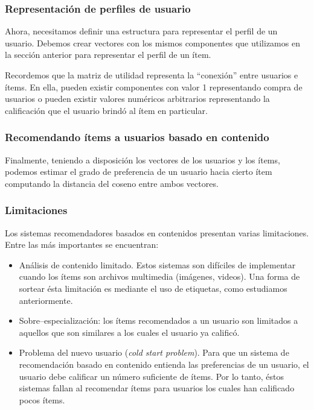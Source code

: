 			\subsubsection{Representación de perfiles de usuario}
				Ahora, necesitamos definir una estructura para representar el perfil de un usuario. Debemos crear vectores con los mismos componentes que utilizamos en la sección anterior para representar el perfil de un ítem. \par
				
				Recordemos que la matriz de utilidad representa la \enquote{conexión} entre usuarios e ítems. En ella, pueden existir componentes con valor 1 representando compra de usuarios o pueden existir valores numéricos arbitrarios representando la calificación que el usuario brindó al ítem en particular. \par
				
			\subsubsection{Recomendando ítems a usuarios basado en contenido}	
				Finalmente, teniendo a disposición los vectores de los usuarios y los ítems, podemos estimar el grado de preferencia de un usuario hacia cierto ítem computando la distancia del coseno entre ambos vectores.
				
			\subsubsection{Limitaciones}
				Los sistemas recomendadores basados en contenidos presentan varias limitaciones. Entre las más importantes se encuentran:
				\begin{itemize}
					\item Análisis de contenido limitado. Estos sistemas son difíciles de implementar cuando los ítems son archivos multimedia (imágenes, videos). Una forma de sortear ésta limitación es mediante el uso de etiquetas, como estudiamos anteriormente.
					\item Sobre--especialización: los ítems recomendados a un usuario son limitados a aquellos que son similares a los cuales el usuario ya calificó.
					\item Problema del nuevo usuario (\textit{cold start problem}). Para que un sistema de recomendación basado en contenido entienda las preferencias de un usuario, el usuario debe calificar un número suficiente de ítems. Por lo tanto, éstos sistemas fallan al recomendar ítems para usuarios los cuales han calificado pocos ítems.
				\end{itemize}
			

